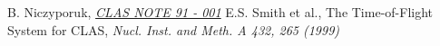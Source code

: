 \begin{thebibliography}{mybib}
  {B. Niczyporuk},   \href{http://www.jlab.org/Hall-B/notes/clas_notes91/note91-001.pdf} {\it CLAS NOTE 91 - 001} 
   {E.S. Smith et al.}, The Time-of-Flight System for CLAS, {\it Nucl. Inst. and Meth. A 432, 265 (1999)}
\end{thebibliography}
